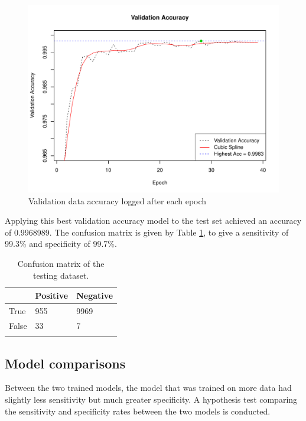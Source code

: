 \begin{figure}[ht]
	\centering
	\includegraphics[width=\textwidth]{Images/7_valid_acc5.pdf}
	\caption{Validation data accuracy logged after each epoch}
	\label{results-valid-acc5-fig}
\end{figure}

Applying this best validation accuracy model to the test set achieved an accuracy of 0.9968989. The confusion matrix is given by Table \ref{results-confmat5-tab}, to give a sensitivity of 99.3\% and specificity of 99.7\%.

\begin{table}[ht]
	\centering
	\begin{tabular}{@{}lll@{}}
	\toprule[1.5pt]
	& Positive & Negative\\
	\midrule
	True & 955 & 9969\\
	False & 33 & 7\\
	\bottomrule[1.5pt]\\
	\end{tabular}
	\caption{Confusion matrix of the testing dataset.}
	\label{results-confmat5-tab}
\end{table}

\subsection*{Model comparisons}

Between the two trained models, the model that was trained on more data had slightly less sensitivity but much greater specificity. A hypothesis test comparing the sensitivity and specificity rates between the two models is conducted.

